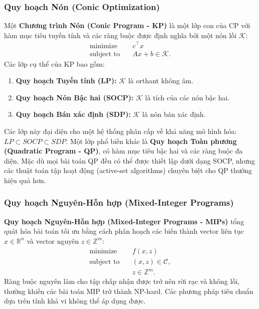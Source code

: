 \subsubsection{Quy hoạch Nón (Conic Optimization)}
Một \textbf{Chương trình Nón (Conic Program - KP)} là một lớp con của CP với hàm mục tiêu tuyến tính và các ràng buộc được định nghĩa bởi một nón lồi $\mathcal{K}$:
\begin{subequations}
\label{eq:conic_program}
\begin{align}
\text{minimize} \quad   & c^\top x \label{eq:kp_objective}                 \\
\text{subject to} \quad & Ax + b \in \mathcal{K}. \label{eq:kp_constraint}
\end{align}
\end{subequations}
Các lớp cụ thể của KP bao gồm:
\begin{enumerate}
\item \textbf{Quy hoạch Tuyến tính (LP):} $\mathcal{K}$ là orthant không âm.
\item \textbf{Quy hoạch Nón Bậc hai (SOCP):} $\mathcal{K}$ là tích của các nón bậc hai.
\item \textbf{Quy hoạch Bán xác định (SDP):} $\mathcal{K}$ là nón bán xác định.
\end{enumerate}
Các lớp này đại diện cho một hệ thống phân cấp về khả năng mô hình hóa: $LP \subset SOCP \subset SDP$. Một lớp phổ biến khác là \textbf{Quy hoạch Toàn phương (Quadratic Program - QP)}, có hàm mục tiêu bậc hai và các ràng buộc đa diện. Mặc dù mọi bài toán QP đều có thể được thiết lập dưới dạng SOCP, nhưng các thuật toán tập hoạt động (active-set algorithms) chuyên biệt cho QP thường hiệu quả hơn.

\subsubsection{Quy hoạch Nguyên-Hỗn hợp (Mixed-Integer Programs)}

\textbf{Quy hoạch Nguyên-Hỗn hợp (Mixed-Integer Programs - MIPs)} tổng quát hóa bài toán tối ưu bằng cách phân hoạch các biến thành vector liên tục $x \in \mathbb{R}^n$ và vector nguyên $z \in \mathbb{Z}^m$:
\begin{subequations}\label{eq:mip}
\begin{align}
\text{minimize} \quad   & f(x, z) \label{eq:mip_objective}                  \\
\text{subject to} \quad & (x, z) \in \mathcal{C}, \label{eq:mip_constraint} \\
& z \in \mathbb{Z}^m. \label{eq:mip_integer}
\end{align}
\end{subequations}
Ràng buộc nguyên làm cho tập chấp nhận được trở nên rời rạc và không lồi, thường khiến các bài toán MIP trở thành NP-hard. Các phương pháp tiêu chuẩn dựa trên tính khả vi không thể áp dụng được.

